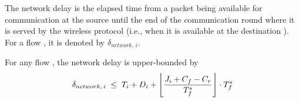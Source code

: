 

\begin{definition}
The network delay is the elapsed time from
a packet being available for communication at the source \cpsrc
until
the end of the communication round where it is served by the wireless protocol (i.e., when it is available at the destination \cpdst).
For a flow \flowi, it is denoted by $\delta_{network, \,i}$.
\end{definition}

\begin{lemma}\label{lem:delta_network}
For any flow \flowi, the network delay is upper-bounded by
\begin{equation}
\label{eq:delta_network}
\delta_{network, \,i} \; \leq \; T_i + D_i + \floor*{\frac{\jitteri + C_f - C_r}{T_f^s}}\cdot T_f^s
\end{equation}
\end{lemma}
